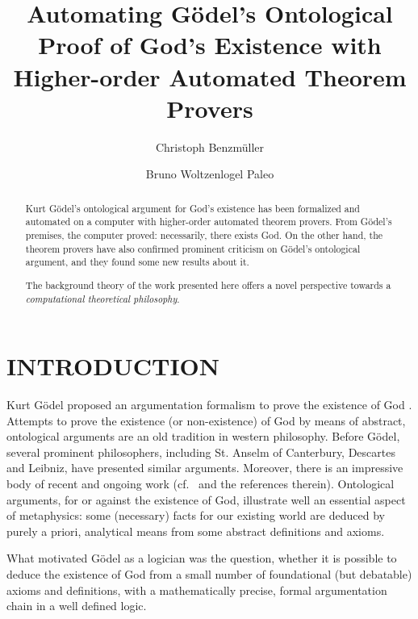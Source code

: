 \documentclass{ecai2014}
\begin{document}
\title{Automating G\"odel's Ontological Proof of God's Existence with Higher-order Automated Theorem Provers}

\author{Christoph Benzm\"uller
  \and Bruno Woltzenlogel Paleo  
}

\maketitle


\begin{abstract}
  Kurt G{\"o}del's ontological argument for God's existence has been
  formalized and automated on a computer with higher-order automated
  theorem provers. From G{\"o}del's premises, the computer proved:
  necessarily, there exists God. On the other hand, the theorem
  provers have also confirmed prominent criticism on G{\"o}del's
  ontological argument, and they found some new results about it.  

  The background theory of the work presented here offers a novel
  perspective towards a \emph{computational theoretical philosophy}.
\end{abstract}

\section{INTRODUCTION}
Kurt G{\"o}del proposed an argumentation formalism to prove the
existence of God \cite{GoedelNotes,ScottNotes}. Attempts to prove the
existence (or non-existence) of God by means of abstract, ontological
arguments are an old tradition in western philosophy.  Before
G{\"o}del, several prominent philosophers, including St. Anselm of
Canterbury, Descartes and Leibniz, have presented similar
arguments. Moreover, there is an impressive body of recent and ongoing
work (cf.~\cite{sobel2004logic,Fitting,ContemporaryBibliography} and the references therein).
Ontological arguments, for or against the existence of God,
illustrate well an essential aspect of metaphysics: some (necessary) facts
for our existing world are deduced by purely a priori, analytical means from some
abstract definitions and axioms. %

What motivated G{\"o}del as a logician was the question, whether it is
possible to deduce the existence of God from a small number of
foundational (but debatable) axioms and definitions, with a mathematically precise,
formal argumentation chain in a well defined logic.
\end{document}
